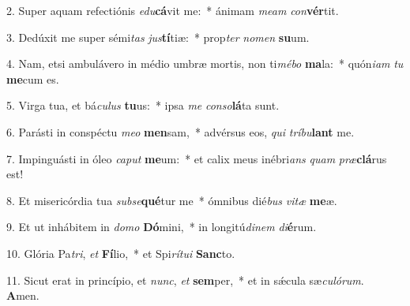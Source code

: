 2. Super aquam refectiónis \textit{e}\textit{du}\textbf{cá}vit me:~*  ánimam \textit{me}\textit{am} \textit{con}\textbf{vér}tit.\

3. Dedúxit me super sémi\textit{tas} \textit{jus}\textbf{tí}tiæ:~*  prop\textit{ter} \textit{no}\textit{men} \textbf{su}um.\

4. Nam, etsi ambulávero in médio umbræ mortis, non ti\textit{mé}\textit{bo} \textbf{ma}la:~*  quón\textit{i}\textit{am} \textit{tu} \textbf{me}cum es.\

5. Virga tua, et bá\textit{cu}\textit{lus} \textbf{tu}us:~*  ipsa \textit{me} \textit{con}\textit{so}\textbf{lá}ta sunt.\

6. Parásti in conspéctu \textit{me}\textit{o} \textbf{men}sam,~*  advérsus eos, \textit{qui} \textit{trí}\textit{bu}\textbf{lant} me.\

7. Impinguásti in óleo \textit{ca}\textit{put} \textbf{me}um:~*  et calix meus inébri\textit{ans} \textit{quam} \textit{præ}\textbf{clá}rus est!\

8. Et misericórdia tua \textit{sub}\textit{se}\textbf{qué}tur me~*  ómnibus dié\textit{bus} \textit{vi}\textit{tæ} \textbf{me}æ.\

9. Et ut inhábitem in \textit{do}\textit{mo} \textbf{Dó}mini,~*  in longitú\textit{di}\textit{nem} \textit{di}\textbf{é}rum.\

10. Glória Pa\textit{tri}, \textit{et} \textbf{Fí}lio,~*  et Spi\textit{rí}\textit{tu}\textit{i} \textbf{Sanc}to.\

11. Sicut erat in princípio, et \textit{nunc}, \textit{et} \textbf{sem}per,~*  et in sǽcula sæ\textit{cu}\textit{ló}\textit{rum}. \textbf{A}men.\

